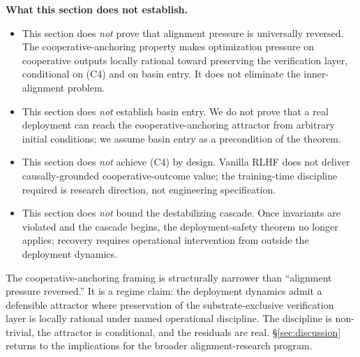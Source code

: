 \textbf{What this section does not establish.}

\begin{itemize}
\item This section does \emph{not} prove that alignment pressure is
  universally reversed. The cooperative-anchoring property makes
  optimization pressure on cooperative outputs locally rational
  toward preserving the verification layer, conditional on (C4)
  and on basin entry. It does not eliminate the inner-alignment
  problem.
\item This section does \emph{not} establish basin entry. We do not
  prove that a real deployment can reach the cooperative-anchoring
  attractor from arbitrary initial conditions; we assume basin
  entry as a precondition of the theorem.
\item This section does \emph{not} achieve (C4) by design. Vanilla
  RLHF does not deliver causally-grounded cooperative-outcome
  value; the training-time discipline required is research
  direction, not engineering specification.
\item This section does \emph{not} bound the destabilizing cascade.
  Once invariants are violated and the cascade begins, the
  deployment-safety theorem no longer applies; recovery requires
  operational intervention from outside the deployment dynamics.
\end{itemize}

The cooperative-anchoring framing is structurally narrower than
``alignment pressure reversed.'' It is a regime claim: the
deployment dynamics admit a defensible attractor where preservation
of the substrate-exclusive verification layer is locally rational
under named operational discipline. The discipline is non-trivial,
the attractor is conditional, and the residuals are real.
\S\ref{sec:discussion} returns to the implications for the broader
alignment-research program.
